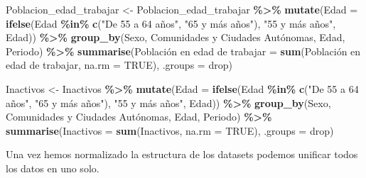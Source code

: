 \documentclass[notspecified,article,submit,moreauthors,pdftex]{Definitions/mdpi}
\newenvironment{Shaded}{\begin{snugshade}}{\end{snugshade}}
\newcommand{\AttributeTok}[1]{\textcolor[rgb]{0.13,0.29,0.53}{#1}}
\newcommand{\ConstantTok}[1]{\textcolor[rgb]{0.56,0.35,0.01}{#1}}
\newcommand{\FunctionTok}[1]{\textcolor[rgb]{0.13,0.29,0.53}{\textbf{#1}}}
\newcommand{\NormalTok}[1]{#1}
\newcommand{\OtherTok}[1]{\textcolor[rgb]{0.56,0.35,0.01}{#1}}
\newcommand{\SpecialCharTok}[1]{\textcolor[rgb]{0.81,0.36,0.00}{\textbf{#1}}}
\newcommand{\StringTok}[1]{\textcolor[rgb]{0.31,0.60,0.02}{#1}}
\begin{document}
\begin{Shaded}
\begin{Highlighting}[]
\NormalTok{Poblacion\_edad\_trabajar }\OtherTok{\textless{}{-}}\NormalTok{ Poblacion\_edad\_trabajar }\SpecialCharTok{\%\textgreater{}\%}
  \FunctionTok{mutate}\NormalTok{(}\AttributeTok{Edad =} \FunctionTok{ifelse}\NormalTok{(Edad }\SpecialCharTok{\%in\%} \FunctionTok{c}\NormalTok{(}\StringTok{"De 55 a 64 años"}\NormalTok{, }\StringTok{"65 y más años"}\NormalTok{), }\StringTok{"55 y más años"}\NormalTok{, Edad)) }\SpecialCharTok{\%\textgreater{}\%}
  \FunctionTok{group\_by}\NormalTok{(Sexo, }\StringTok{\textasciigrave{}}\AttributeTok{Comunidades y Ciudades Autónomas}\StringTok{\textasciigrave{}}\NormalTok{, Edad, Periodo) }\SpecialCharTok{\%\textgreater{}\%}
  \FunctionTok{summarise}\NormalTok{(}\StringTok{\textasciigrave{}}\AttributeTok{Población en edad de trabajar}\StringTok{\textasciigrave{}} \OtherTok{=} \FunctionTok{sum}\NormalTok{(}\StringTok{\textasciigrave{}}\AttributeTok{Población en edad de trabajar}\StringTok{\textasciigrave{}}\NormalTok{, }\AttributeTok{na.rm =} \ConstantTok{TRUE}\NormalTok{), }\AttributeTok{.groups =} \StringTok{\textquotesingle{}drop\textquotesingle{}}\NormalTok{)}

\NormalTok{Inactivos }\OtherTok{\textless{}{-}}\NormalTok{ Inactivos }\SpecialCharTok{\%\textgreater{}\%}
  \FunctionTok{mutate}\NormalTok{(}\AttributeTok{Edad =} \FunctionTok{ifelse}\NormalTok{(Edad }\SpecialCharTok{\%in\%} \FunctionTok{c}\NormalTok{(}\StringTok{"De 55 a 64 años"}\NormalTok{, }\StringTok{"65 y más años"}\NormalTok{), }\StringTok{"55 y más años"}\NormalTok{, Edad)) }\SpecialCharTok{\%\textgreater{}\%}
  \FunctionTok{group\_by}\NormalTok{(Sexo, }\StringTok{\textasciigrave{}}\AttributeTok{Comunidades y Ciudades Autónomas}\StringTok{\textasciigrave{}}\NormalTok{, Edad, Periodo) }\SpecialCharTok{\%\textgreater{}\%}
  \FunctionTok{summarise}\NormalTok{(}\StringTok{\textasciigrave{}}\AttributeTok{Inactivos}\StringTok{\textasciigrave{}} \OtherTok{=} \FunctionTok{sum}\NormalTok{(}\StringTok{\textasciigrave{}}\AttributeTok{Inactivos}\StringTok{\textasciigrave{}}\NormalTok{, }\AttributeTok{na.rm =} \ConstantTok{TRUE}\NormalTok{), }\AttributeTok{.groups =} \StringTok{\textquotesingle{}drop\textquotesingle{}}\NormalTok{)}
\end{Highlighting}
\end{Shaded}

Una vez hemos normalizado la estructura de los datasets podemos unificar
todos los datos en uno solo.
\end{document}

